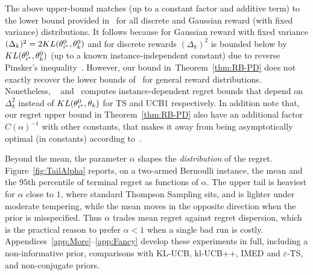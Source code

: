 \documentclass[11pt]{article}
\newcommand{\scKL}{\textsc{KL}}
\begin{document}
The above upper-bound matches (up to a constant factor and additive term) to the lower bound provided in~\cite{lai1985asymptotically,burnetas1996optimal} for all discrete and Gaussian reward (with fixed variance) distributions. It follows because for Gaussian reward with fixed variance $(\Delta_k)^2=2\scKL(\theta_{i^*}^0,\theta_{k}^0)$ and for  discrete rewards $(\Delta_k)^2 $ is bounded below by  $\scKL(\theta_{i^*}^0,\theta_{k}^0)$ (up to a known instance-independent constant) due to reverse Pinsker's inequality~\cite[Lemma 6.3]{Csiszar2006}. However, our bound in~Theorem~\ref{thm:RB-PD} does not exactly recover the lower bounds of~\cite{lai1985asymptotically,burnetas1996optimal} for general reward distributions. Nonetheless, ~\cite{agrawal2012analysis} and~\cite{Auer2002} computes instance-dependent regret bounds that depend on $\Delta_k^2$ instead of $\scKL(\theta_{i^*}^0,\theta_{k})$ for TS and UCB1 respectively. In addition note that, our regret upper bound in Theorem~\ref{thm:RB-PD} also have an additional factor $C(\alpha)^{-1}$ with other constants, that makes it away from being asymptotically optimal (in constants) according to~\cite{lai1985asymptotically}.%

Beyond the mean, the parameter $\alpha$ shapes the \emph{distribution} of the regret. Figure~\ref{fig:TailAlpha} reports, on a two-armed Bernoulli instance, the mean and the $95$th percentile of terminal regret as functions of $\alpha$. The upper tail is heaviest for $\alpha$ close to $1$, where standard Thompson Sampling sits, and is lighter under moderate tempering, while the mean moves in the opposite direction when the prior is misspecified. Thus $\alpha$ trades mean regret against regret dispersion, which is the practical reason to prefer $\alpha < 1$ when a single bad run is costly. Appendices~\ref{app:More}--\ref{app:Fancy} develop these experiments in full, including a non-informative prior, comparisons with KL-UCB, kl-UCB++, IMED and $\varepsilon$-TS, and non-conjugate priors.
\end{document}
